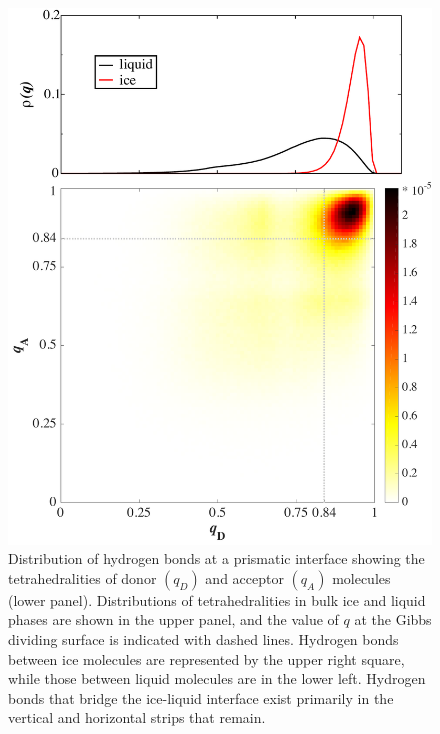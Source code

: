 \documentclass[journal = jpccck, manuscript = article]{achemso}
\begin{document}
\newpage
\begin{figure}
\includegraphics[width=5in]{hbtet.pdf}
\caption{\label{fig:tetHBMatrix} Distribution of hydrogen bonds at a
  prismatic interface showing the tetrahedralities of donor $(q_D)$
  and acceptor $(q_A)$ molecules (lower panel). Distributions of
  tetrahedralities in bulk ice and liquid phases are shown in the
  upper panel, and the value of $q$ at the Gibbs dividing surface is
  indicated with dashed lines. Hydrogen bonds between ice molecules
  are represented by the upper right square, while those between
  liquid molecules are in the lower left.  Hydrogen bonds that bridge
  the ice-liquid interface exist primarily in the vertical and
  horizontal strips that remain.}
\end{figure}
\end{document}
